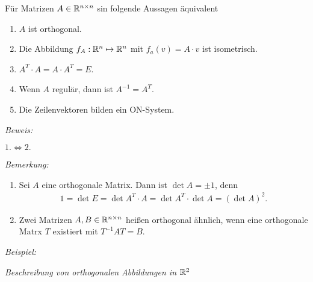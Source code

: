 \begin{mysatz}\label{orthogonaleMatrix}
    Für Matrizen $A\in \mathbb{R}^{n \times n}$ sin folgende Aussagen äquivalent
    \begin{enumerate}
        \item $A$ ist orthogonal.
        \item Die Abbildung $f_A : \mathbb{R}^n \mapsto \mathbb{R}^n$ mit $f_a(v) = A \cdot v$ ist isometrisch.
        \item \label{oM-3} $A^T \cdot A = A \cdot A^T = E$.
        \item Wenn $A$ regulär, dann ist $A^{-1} = A^T$.
        \item Die Zeilenvektoren bilden ein ON-System.
    \end{enumerate}

    \textit{Beweis:}\medskip

    $1.\Leftrightarrow 2.$
\end{mysatz}


\textit{Bemerkung:}
\begin{enumerate}
    \item Sei $A$ eine orthogonale Matrix. Dann ist $\det A = \pm 1$, denn
        \begin{align*}
            1 = \det E = \det A^T \cdot A = \det A^T \cdot \det A = (\det A)^2.
        \end{align*}
    \item Zwei Matrizen $A, B \in \mathbb{R}^{n \times n}$ heißen orthogonal ähnlich, wenn eine orthogonale Matrx $T$ existiert mit $T^{-1} A T = B$.
\end{enumerate}



\textit{Beispiel:}\medskip

\textit{Beschreibung von orthogonalen Abbildungen in $\mathbb{R}^2$}

